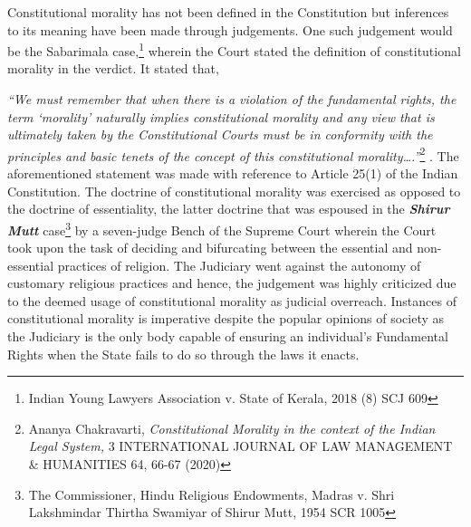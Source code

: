 \setcounter{figure}{0}
\setcounter{table}{0}
\setcounter{footnote}{0}



\begin{multicols}{2}


\noi
Constitutional morality has not been defined in the Constitution but inferences to its meaning
have been made through judgements. One such judgement would be the Sabarimala case,\footnote{Indian Young Lawyers Association v. State of Kerala, 2018 (8) SCJ 609}
wherein the Court stated the definition of constitutional morality in the verdict. It stated that,

\noi
\textit{“We must remember that when there is a violation of the fundamental rights, the term
‘morality’ naturally implies constitutional morality and any view that is ultimately taken by
the Constitutional Courts must be in conformity with the principles and basic tenets of the
concept of this constitutional morality….”}\footnote{Ananya Chakravarti, \textit{Constitutional Morality in the context of the Indian Legal System,} 3 INTERNATIONAL JOURNAL OF LAW MANAGEMENT \& HUMANITIES 64, 66-67 (2020)}
. The aforementioned statement was made with reference to Article 25(1) of the Indian Constitution. The doctrine of constitutional morality
was exercised as opposed to the doctrine of essentiality, the latter doctrine that was espoused
in the \textbf{\textit{Shirur Mutt}} case\footnote{The Commissioner, Hindu Religious Endowments, Madras v. Shri Lakshmindar Thirtha Swamiyar of Shirur Mutt, 1954 SCR 1005}  by a seven-judge Bench of the Supreme Court wherein the Court
took upon the task of deciding and bifurcating between the essential and non-essential
practices of religion. The Judiciary went against the autonomy of customary religious
practices and hence, the judgement was highly criticized due to the deemed usage of
constitutional morality as judicial overreach. Instances of constitutional morality is
imperative despite the popular opinions of society as the Judiciary is the only body capable of
ensuring an individual’s Fundamental Rights when the State fails to do so through the laws it
enacts.


\end{multicols}
